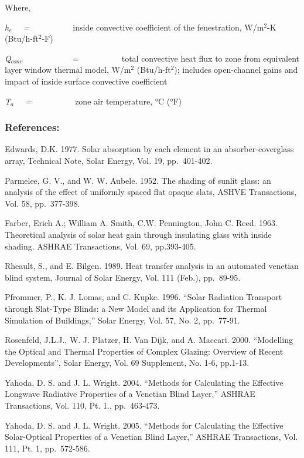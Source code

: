 Where,

\emph{h\(_{c}\)~~ = ~~~~~~~~~} inside convective coefficient of the fenestration, W/m\(^{2}\)-K (Btu/h-ft\(^{2}\)-F)

\emph{Q\(_{conv}\)~~~~~~~~~~~ = ~~~~~~~~~} total convective heat flux to zone from equivalent layer window thermal model, W/m\(^{2}\) (Btu/h-ft\(^{2}\)); includes open-channel gains and impact of inside surface convective coefficient

\emph{T\(_{a}\)~~ = ~~~~~~~~~} zone air temperature, °C (°F)

\subsubsection{References:}\label{references-2-008}

Edwards, D.K. 1977. Solar absorption by each element in an absorber-coverglass array, Technical Note, Solar Energy, Vol. 19, pp.~401-402.

Parmelee, G. V., and W. W. Aubele. 1952. The shading of sunlit glass: an analysis of the effect of uniformly spaced flat opaque slats, ASHVE Transactions, Vol. 58, pp.~377-398.

Farber, Erich A.; William A. Smith, C.W. Pennington, John C. Reed. 1963. Theoretical analysis of solar heat gain through insulating glass with inside shading. ASHRAE Transactions, Vol. 69, pp.393-405.

Rheault, S., and E. Bilgen. 1989. Heat transfer analysis in an automated venetian blind system, Journal of Solar Energy, Vol. 111 (Feb.), pp.~89-95.

Pfrommer, P., K. J. Lomas, and C. Kupke. 1996. ``Solar Radiation Transport through Slat-Type Blinds: a New Model and its Application for Thermal Simulation of Buildings,'' Solar Energy, Vol. 57, No. 2, pp.~77-91.

Rosenfeld, J.L.J., W. J. Platzer, H. Van Dijk, and A. Maccari. 2000. ``Modelling the Optical and Thermal Properties of Complex Glazing: Overview of Recent Developments'', Solar Energy, Vol. 69 Supplement, No. 1-6, pp.1-13.

Yahoda, D. S. and J. L. Wright. 2004. ``Methods for Calculating the Effective Longwave Radiative Properties of a Venetian Blind Layer,'' ASHRAE Transactions, Vol. 110, Pt. 1., pp.~463-473.

Yahoda, D. S. and J. L. Wright. 2005. ``Methods for Calculating the Effective Solar-Optical Properties of a Venetian Blind Layer,'' ASHRAE Transactions, Vol. 111, Pt. 1, pp.~572-586.

